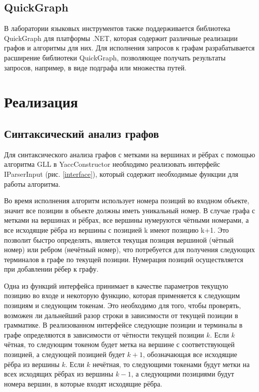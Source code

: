\documentclass[14pt]{matmex-diploma}
\begin{document}
\subsection{QuickGraph}

В лаборатории языковых инструментов также поддерживается библиотека QuickGraph для платформы .NET, которая содержит различные реализации графов и алгоритмы для них. Для исполнения запросов к графам разрабатывается расширение библиотеки QuickGraph, позволяющее получать результаты запросов, например, в виде подграфа или множества путей.

\section{Реализация}

\subsection{Синтаксический анализ графов}
Для синтаксического анализа графов с метками на вершинах и рёбрах с помощью алгоритма GLL в YaccConstructor необходимо реализовать интерфейс IParserInput (рис. \ref{interface}), который содержит необходимые функции для работы алгоритма.

Во время исполнения алгоритм использует номера позиций во входном объекте, значит все позиции в объекте должны иметь уникальный номер. В случае графа с метками на вершинах и рёбрах, все вершины нумеруются чётными номерами, а все исходящие рёбра из вершины с позицией k имеют позицию k+1. Это позволит быстро определять, является текущая позиция вершиной (чётный номер) или ребром (нечётный номер), что потребуется для получения следующих терминалов в графе по текущей позиции. Нумерация позиций осуществляется при добавлении рёбер к графу.

Одна из функций интерфейса принимает в качестве параметров текущую позицию во входе и некоторую функцию, которая применяется к следующим позициям и следующим токенам. Это необходимо для того, чтобы проверять, возможен ли дальнейший разор строки в зависимости от текущей позиции в грамматике. В реализованном интерфейсе следующие позиции и терминалы в графе определяются в зависимости от чётности текущей позиции $k$. Если $k$ чётная, то следующим токеном будет метка на вершине с соответствующей позицией, а следующей позицией будет $k+1$, обозначающая все исходящие рёбра из вершины $k$. Если $k$ нечётная, то следующими токенами будут метки на всех исходящих рёбрах из вершины $k-1$, а следующими позициями будут номера вершин, в которые входят исходящие рёбра.
\end{document}
